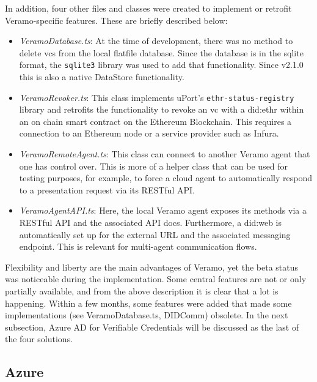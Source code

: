         In addition, four other files and classes were created to implement or retrofit Veramo-specific features. These are briefly described below:
    
        \begin{itemize}
            \item \textit{VeramoDatabase.ts}: At the time of development, there was no method to delete \acp{vc} from the local flatfile database. Since the database is in the sqlite format, the \texttt{sqlite3} library was used to add that functionality. Since v2.1.0 this is also a native DataStore functionality.
            \item \textit{VeramoRevoker.ts}: This class implements uPort's \texttt{ethr-status-registry} library and retrofits the functionality to revoke an \ac{vc} with a did:ethr within an on chain smart contract on the Ethereum Blockchain. This requires a connection to an Ethereum node or a service provider such as Infura.
            \item \textit{VeramoRemoteAgent.ts}: This class can connect to another Veramo agent that one has control over. This is more of a helper class that can be used for testing purposes, for example, to force a cloud agent to automatically respond to a presentation request via its RESTful API.
            \item \textit{VeramoAgentAPI.ts}: Here, the local Veramo agent exposes its methods via a RESTful API and the associated API docs. Furthermore, a did:web is automatically set up for the external URL and the associated messaging endpoint. This is relevant for multi-agent communication flows.
        \end{itemize}
    
        Flexibility and liberty are the main advantages of Veramo, yet the beta status was noticeable during the implementation. Some central features are not or only partially available, and from the above description it is clear that a lot is happening. Within a few months, some features were added that made some implementations (see VeramoDatabase.ts, DIDComm) obsolete. In the next subsection, Azure AD for Verifiable Credentials will be discussed as the last of the four solutions. 
    
        \subsection{Azure}
        
